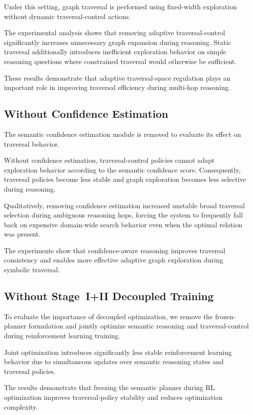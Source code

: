 \documentclass[10pt,conference]{IEEEtran}
\begin{document}
Under this setting, graph traversal is performed using fixed-width exploration without dynamic traversal-control actions.

The experimental analysis shows that removing adaptive traversal-control significantly increases unnecessary graph expansion during reasoning. Static traversal additionally introduces inefficient exploration behavior on simple reasoning questions where constrained traversal would otherwise be sufficient.

These results demonstrate that adaptive traversal-space regulation plays an important role in improving traversal efficiency during multi-hop reasoning.

\subsection{Without Confidence Estimation}

The semantic confidence estimation module is removed to evaluate its effect on traversal behavior.

Without confidence estimation, traversal-control policies cannot adapt exploration behavior according to the semantic confidence score. Consequently, traversal policies become less stable and graph exploration becomes less selective during reasoning.

Qualitatively, removing confidence estimation increased unstable broad traversal selection during ambiguous reasoning hops, forcing the system to frequently fall back on expensive domain-wide search behavior even when the optimal relation was present.

The experiments show that confidence-aware reasoning improves traversal consistency and enables more effective adaptive graph exploration during symbolic traversal.

\subsection{Without Stage~I+II Decoupled Training}

To evaluate the importance of decoupled optimization, we remove the frozen-planner formulation and jointly optimize semantic reasoning and traversal-control during reinforcement learning training.

Joint optimization introduces significantly less stable reinforcement learning behavior due to simultaneous updates over semantic reasoning states and traversal policies.

The results demonstrate that freezing the semantic planner during RL optimization improves traversal-policy stability and reduces optimization complexity.
\end{document}
